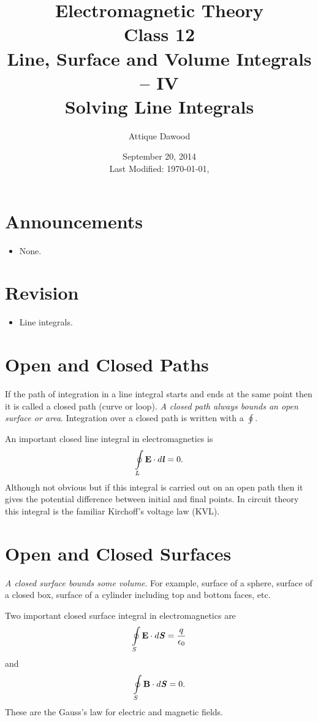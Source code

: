 \documentclass[12pt,a4paper]{article}
\title{Electromagnetic Theory\\Class 12\\Line, Surface and Volume Integrals -- IV\\Solving Line Integrals}
\author{Attique Dawood}
\date{September 20, 2014\\[0.2cm] Last Modified: \today, \currenttime}
\begin{document}
\maketitle
\section{Announcements}
\begin{itemize}
\item None.
\end{itemize}
\section{Revision}
\begin{itemize}
\item Line integrals.
\end{itemize}
\section{Open and Closed Paths}
If the path of integration in a line integral starts and ends at the same point then it is called a closed path (curve or loop). \textit{A closed path always bounds an open surface or area}. Integration over a closed path is written with a $\oint$.

An important closed line integral in electromagnetics is
\begin{equation}
\oint\limits_L \textbf{E}\cdot d\textbf{\textit{l}}=0.
\end{equation}
Although not obvious but if this integral is carried out on an open path then it gives the potential difference between initial and final points. In circuit theory this integral is the familiar Kirchoff's voltage law (KVL).
\section{Open and Closed Surfaces}
\textit{A closed surface bounds some volume}. For example, surface of a sphere, surface of a closed box, surface of a cylinder including top and bottom faces, etc.

Two important closed surface integral in electromagnetics are
\begin{equation}
\oint\limits_S \textbf{E}\cdot d\textbf{\textit{S}}=\dfrac{q}{\epsilon_0}
\end{equation}
and
\begin{equation}
\oint\limits_S \textbf{B}\cdot d\textbf{\textit{S}}=0.
\end{equation}
These are the Gauss's law for electric and magnetic fields.
\end{document}
